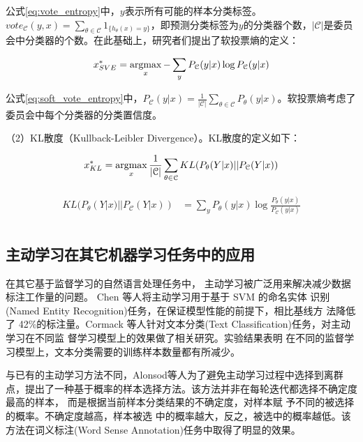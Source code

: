公式\ref{eq:vote_entropy}中，$y$表示所有可能的样本分类标签。$vote_\mathcal{C}(y,x)=\sum_{\theta \in \mathcal{C}}1_{\{h_\theta(x)=y\}}$，即预测分类标签为$y$的分类器个数，$|\mathcal{C}|$是委员会中分类器的个数。在此基础上，研究者们提出了软投票熵的定义：

\begin{align}\label{eq:soft_vote_entropy}
\begin{aligned}
x_{SVE}^*&=\operatorname*{argmax}_x -\sum_{y}P_\mathcal{C}(y|x)\log P_\mathcal{C}(y|x)\\
\end{aligned}
\end{align}

公式\ref{eq:soft_vote_entropy}中，$P_\mathcal{C}(y|x)=\frac{1}{|\mathcal{C}|}\sum_{\theta \in \mathcal{C}}P_\theta (y|x)$。软投票熵考虑了委员会中每个分类器的分类置信度。

（2）KL散度（Kullback-Leibler Divergence）。KL散度的定义如下：

\begin{align}\label{eq:kl_divergence}
\begin{aligned}
x_{KL}^*&=\operatorname*{argmax}_x \frac{1}{|\mathcal{C}|}\sum_{\theta \in \mathcal{C}}KL(P_\theta(Y|x)||P_\mathcal{C}(Y|x)) \\
\end{aligned}
\end{align}

\begin{align}
\begin{aligned}
KL(P_\theta(Y|x)||P_\mathcal{C}(Y|x)) &=\sum_{y}P_\theta (y|x)\log \frac{P_\theta(y|x)}{P_\mathcal{C}(y|x)} \\
\end{aligned}
\end{align}

\subsection{主动学习在其它机器学习任务中的应用}
在其它基于监督学习的自然语言处理任务中， 主动学习被广泛用来解决减少数据标注工作量的问题。 Chen 等人\cite{chen2015study}将主动学习用于基于 SVM 的命名实体 识别(Named Entity Recognition)任务，在保证模型性能的前提下，相比基线方 法降低了 42\%的标注量。Cormack 等人\cite{cormack2016scalability}针对文本分类(Text Classification)任务，对主动学习在不同监 督学习模型上的效果做了相关研究。实验结果表明 在不同的监督学习模型上，文本分类需要的训练样本数量都有所减少。

与已有的主动学习方法不同，Alonsod等人\cite{alonso2015active}为了避免主动学习过程中选择到离群点，提出了一种基于概率的样本选择方法。该方法并非在每轮迭代都选择不确定度最高的样本， 而是根据当前样本分类结果的不确定度，对样本赋 予不同的被选择的概率。不确定度越高，样本被选 中的概率越大，反之，被选中的概率越低。该方法在词义标注(Word Sense Annotation)任务中取得了明显的效果。

